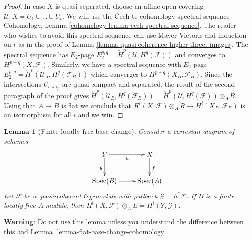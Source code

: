 \documentclass{stacks-project}
\theoremstyle{plain}
\newtheorem{lemma}[subsection]{Lemma}
\theoremstyle{definition}
\theoremstyle{remark}
\numberwithin{equation}{subsection}
\def\Spec{\mathop{\mathrm{Spec}}}
\begin{document}
\begin{proof}
\medskip\noindent
In case $X$ is quasi-separated, choose an affine open covering
$\mathcal{U} : X = U_1 \cup \ldots \cup U_t$. We will use the
{\v C}ech-to-cohomology spectral sequence
Cohomology, Lemma \ref{cohomology-lemma-cech-spectral-sequence}.
The reader who wishes to avoid this spectral sequence
can use Mayer-Vietoris and induction on $t$ as in the proof of
Lemma \ref{lemma-quasi-coherence-higher-direct-images}.
The spectral sequence has $E_2$-page
$E_2^{p, q} = \check{H}^p(\mathcal{U}, \underline{H}^q(\mathcal{F}))$
and converges to $H^{p + q}(X, \mathcal{F})$.
Similarly, we have a spectral sequence with $E_2$-page
$E_2^{p, q} = \check{H}^p(\mathcal{U}_B, \underline{H}^q(\mathcal{F}_B))$
which converges to $H^{p + q}(X_B, \mathcal{F}_B)$.
Since the intersections $U_{i_0 \ldots i_p}$ are quasi-compact
and separated, the result of the second paragraph of the proof gives
$\check{H}^p(\mathcal{U}_B, \underline{H}^q(\mathcal{F}_B)) =
\check{H}^p(\mathcal{U}, \underline{H}^q(\mathcal{F})) \otimes_A B$.
Using that $A \to B$ is flat we conclude that
$H^i(X, \mathcal{F}) \otimes_A B \to H^i(X_B, \mathcal{F}_B)$
is an isomorphism for all $i$ and we win.
\end{proof}

\begin{lemma}[Finite locally free base change]
\label{lemma-finite-locally-free-base-change-cohomology}
Consider a cartesian diagram of schemes
$$
\xymatrix{
Y \ar[d]_{g} \ar[r]_h & X \ar[d]^f \\
\Spec(B) \ar[r] & \Spec(A)
}
$$
Let $\mathcal{F}$ be a quasi-coherent $\mathcal{O}_X$-module
with pullback $\mathcal{G} = h^*\mathcal{F}$.
If $B$ is a finite locally free $A$-module, then
$H^i(X, \mathcal{F}) \otimes_A B = H^i(Y, \mathcal{G})$.
\end{lemma}

\noindent
{\bf Warning}: Do not use this lemma unless you understand the difference
between this and Lemma \ref{lemma-flat-base-change-cohomology}.
\end{document}
